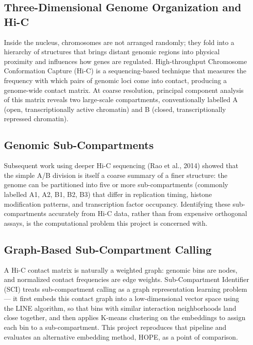 \documentclass[12pt]{article}
\begin{document}
\subsection{Three-Dimensional Genome Organization and Hi-C}
Inside the nucleus, chromosomes are not arranged randomly; they fold into a hierarchy of structures
that brings distant genomic regions into physical proximity and influences how genes are
regulated. High-throughput Chromosome Conformation Capture (Hi-C) is a sequencing-based
technique that measures the frequency with which pairs of genomic loci come into contact,
producing a genome-wide contact matrix. At coarse resolution, principal component analysis of
this matrix reveals two large-scale compartments, conventionally labelled A (open, transcriptionally
active chromatin) and B (closed, transcriptionally repressed chromatin).

\subsection{Genomic Sub-Compartments}
Subsequent work using deeper Hi-C sequencing (Rao et al., 2014) showed that the simple A/B
division is itself a coarse summary of a finer structure: the genome can be partitioned into five
or more sub-compartments (commonly labelled A1, A2, B1, B2, B3) that differ in replication
timing, histone modification patterns, and transcription factor occupancy. Identifying these
sub-compartments accurately from Hi-C data, rather than from expensive orthogonal assays, is
the computational problem this project is concerned with.

\subsection{Graph-Based Sub-Compartment Calling}
A Hi-C contact matrix is naturally a weighted graph: genomic bins are nodes, and normalized
contact frequencies are edge weights. Sub-Compartment Identifier (SCI) treats sub-compartment
calling as a graph representation learning problem — it first embeds this contact graph into a
low-dimensional vector space using the LINE algorithm, so that bins with similar interaction
neighborhoods land close together, and then applies K-means clustering on the embeddings to
assign each bin to a sub-compartment. This project reproduces that pipeline and evaluates an
alternative embedding method, HOPE, as a point of comparison.


\end{document}
